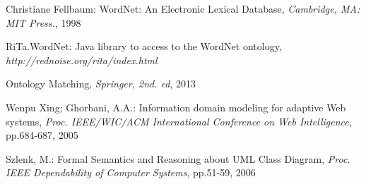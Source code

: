 \documentclass{sig-alternate}
\begin{document}
\begin{thebibliography}{4}
 Christiane Fellbaum: WordNet: An Electronic Lexical Database, 
\textit{Cambridge, MA: MIT Press.}, 1998

 RiTa.WordNet: Java library to access to the WordNet ontology, 
\textit{http://rednoise.org/rita/index.html}

 Ontology Matching, 
\textit{Springer, 2nd. ed}, 2013

 Wenpu Xing; Ghorbani, A.A.: Information domain modeling for adaptive Web systems,
\textit{Proc. IEEE/WIC/ACM International Conference on Web Intelligence}, pp.684-687, 2005

 Szlenk, M.: Formal Semantics and Reasoning about UML Class Diagram,
\textit{Proc. IEEE Dependability of Computer Systems}, pp.51-59, 2006


\end{thebibliography}  


\balancecolumns
\end{document}

